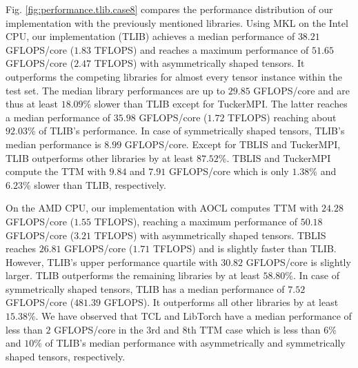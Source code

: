 Fig. \ref{fig:performance.tlib.case8} compares the performance distribution of our implementation with the previously mentioned libraries.
Using MKL on the Intel CPU, our implementation (TLIB) achieves a median performance of $38.21$ GFLOPS/core ($1.83$ TFLOPS) and reaches a maximum performance of $51.65$ GFLOPS/core ($2.47$ TFLOPS) with asymmetrically shaped tensors.
It outperforms the competing libraries for almost every tensor instance within the test set.
The median library performances are up to $29.85$ GFLOPS/core and are thus at least $18.09$\% slower than TLIB except for TuckerMPI.
The latter reaches a median performance of $35.98$ GFLOPS/core ($1.72$ TFLOPS) reaching about $92.03$\% of TLIB's performance.
In case of symmetrically shaped tensors, TLIB's median performance is $8.99$ GFLOPS/core.
Except for TBLIS and TuckerMPI, TLIB outperforms other libraries by at least $87.52$\%.
TBLIS and TuckerMPI compute the TTM with $9.84$ and $7.91$ GFLOPS/core which is only $1.38$\% and $6.23$\% slower than TLIB, respectively.

On the AMD CPU, our implementation with AOCL computes TTM with $24.28$ GFLOPS/core ($1.55$ TFLOPS), reaching a maximum performance of $50.18$ GFLOPS/core ($3.21$ TFLOPS) with asymmetrically shaped tensors.
TBLIS reaches $26.81$ GFLOPS/core ($1.71$ TFLOPS) and is slightly faster than TLIB. 
However, TLIB's upper performance quartile with $30.82$ GFLOPS/core is slightly larger.
TLIB outperforms the remaining libraries by at least $58.80$\%.
In case of symmetrically shaped tensors, TLIB has a median performance of $7.52$ GFLOPS/core ($481.39$ GFLOPS).
It outperforms all other libraries by at least $15.38$\%.
We have observed that TCL and LibTorch have a median performance of less than $2$ GFLOPS/core in the $3$rd and $8$th TTM case which is less than $6$\% and $10$\% of TLIB's median performance with asymmetrically and symmetrically shaped tensors, respectively.

